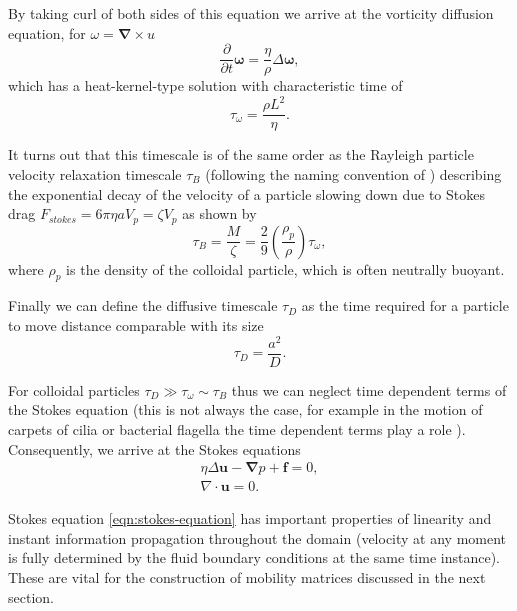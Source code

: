 \documentclass{doctoral}
\newcommand{\pd}{\partial}
\begin{document}
By taking curl of both sides of this equation we arrive at the vorticity diffusion equation, for $\omega = \bm{\nabla} \times u$
\begin{equation}
    \frac{\pd}{\pd t} \bm{\omega}  = \frac{\eta}{\rho} \Delta \bm{\omega} , \label{eqn:vorticity-diffusion}
\end{equation}
which has a heat-kernel-type solution with characteristic time of
\begin{equation}
    \tau_\omega = \frac{\rho L^2}{\eta}.
    \label{eqn:vorticity-timescale}
\end{equation}

It turns out that this timescale is of the same order as the Rayleigh particle velocity relaxation timescale $\tau_B$ (following the naming convention of \textcite{vanKampen_2011}) describing the exponential decay of the velocity of a particle slowing down due to Stokes drag $F_{stokes} = 6 \pi \eta a V_p = \zeta V_p$ as shown by
\begin{equation}
    \tau_B = \frac{M}{\zeta} = \frac{2}{9} \left( \frac{\rho_p}{\rho} \right) \tau_\omega, \label{eqn:raighley-timescale}
\end{equation}
where $\rho_p$ is the density of the colloidal particle, which is often neutrally buoyant.

Finally we can define the diffusive timescale $\tau_D$ as the time required for a particle to move distance comparable with its size
\begin{equation}
    \tau_D = \frac{a^2}{D}.
    \label{eqn:diffusive-timescale}
\end{equation}

For colloidal particles $\tau_D \gg \tau_\omega \sim \tau_B$ thus we can neglect time dependent terms of the Stokes equation (this is not always the case, for example in the motion of carpets of cilia or bacterial flagella the time dependent terms play a role \cite{Wei_2021}).
Consequently, we arrive at the Stokes equations
\begin{eqnarray}
    \eta \Delta \bm{u} - \bm{\nabla} p + \bm{f} = 0, \\
    \nabla \cdot \bm{u} = 0.
    \label{eqn:stokes-equation}
\end{eqnarray}

Stokes equation \eqref{eqn:stokes-equation} has important properties of linearity and instant information propagation throughout the domain (velocity at any moment is fully determined by the fluid boundary conditions at the same time instance).
These are vital for the construction of mobility matrices discussed in the next section.
\end{document}
